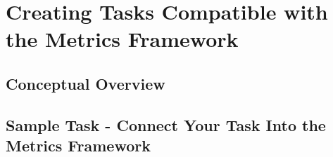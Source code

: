 \chapter{Creating Tasks Compatible with the Metrics Framework}\label{ch:task_design}

\section{Conceptual Overview}

\section{Sample Task - Connect Your Task Into the Metrics Framework}
